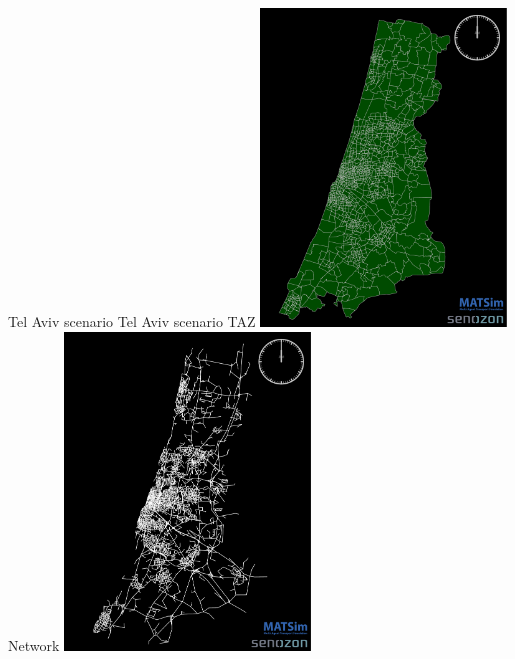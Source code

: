 \createfigure%
{Tel Aviv scenario}%
{Tel Aviv scenario}%
{\label{fig:telavivscenario}}%
{%
  \createsubfigure%
  {TAZ}%
  {\includegraphics[width=0.49\textwidth,angle=0]{using/figures/TelAviv_TAZ}}%
  {\label{fig:TAZ}}%
  {}%
  \createsubfigure%
  {Network}%
	{\includegraphics[width=0.49\textwidth,angle=0]{using/figures/TelAviv_RoadNetwork}}%
  {\label{fig:network}}%
  {}%
}%
{}

